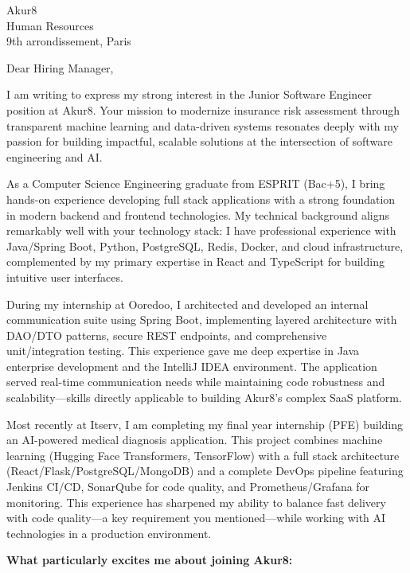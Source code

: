 \documentclass[11pt,a4paper]{letter}
\begin{document}
\begin{letter}{
    Akur8 \\
    Human Resources \\
    9th arrondissement, Paris
}

\opening{Dear Hiring Manager,}

I am writing to express my strong interest in the Junior Software Engineer position at Akur8. Your mission to modernize insurance risk assessment through transparent machine learning and data-driven systems resonates deeply with my passion for building impactful, scalable solutions at the intersection of software engineering and AI.

As a Computer Science Engineering graduate from ESPRIT (Bac+5), I bring hands-on experience developing full stack applications with a strong foundation in modern backend and frontend technologies. My technical background aligns remarkably well with your technology stack: I have professional experience with Java/Spring Boot, Python, PostgreSQL, Redis, Docker, and cloud infrastructure, complemented by my primary expertise in React and TypeScript for building intuitive user interfaces.

During my internship at Ooredoo, I architected and developed an internal communication suite using Spring Boot, implementing layered architecture with DAO/DTO patterns, secure REST endpoints, and comprehensive unit/integration testing. This experience gave me deep expertise in Java enterprise development and the IntelliJ IDEA environment. The application served real-time communication needs while maintaining code robustness and scalability---skills directly applicable to building Akur8's complex SaaS platform.

Most recently at Itserv, I am completing my final year internship (PFE) building an AI-powered medical diagnosis application. This project combines machine learning (Hugging Face Transformers, TensorFlow) with a full stack architecture (React/Flask/PostgreSQL/MongoDB) and a complete DevOps pipeline featuring Jenkins CI/CD, SonarQube for code quality, and Prometheus/Grafana for monitoring. This experience has sharpened my ability to balance fast delivery with code quality---a key requirement you mentioned---while working with AI technologies in a production environment.

\textbf{What particularly excites me about joining Akur8:}


\end{letter}
\end{document}
